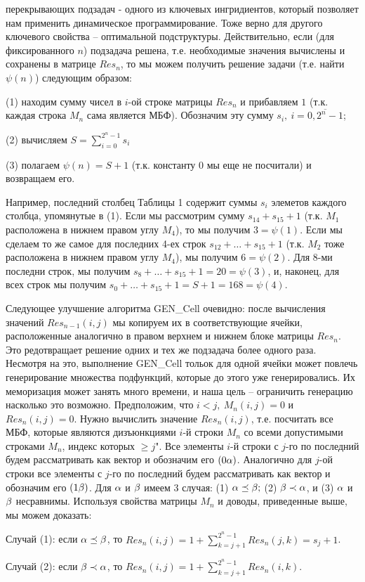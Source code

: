 перекрывающих подзадач - одного из ключевых ингридиентов, 
который позволяет нам применить динамическое программирование.
Тоже верно для другого ключевого свойства -- оптимальной подструктуры.
Действительно, если (для фиксированного $n$) подзадача решена, т.е. необходимые 
значения вычислены и сохранены в матрице $Res_n$, то мы можем получить решение
задачи (т.е. найти $\psi(n)$) следующим образом:\par
  (1) находим сумму чисел в $i$-ой строке матрицы $Res_n$ и прибавляем $1$ (т.к.
  каждая строка $M_n$ сама является МБФ). Обозначим эту сумму 
  $s_i,\ i=\overline{0, 2^n - 1}$;\par
  (2) вычисляем $S = \sum\limits_{i=0}^{2^n - 1} s_i$ \par
  (3) полагаем $\psi(n) = S + 1$ (т.к. константу $0$ мы еще не посчитали) и 
  возвращаем его.\par
Например, последний столбец Таблицы 1 содержит суммы $s_i$
элеметов каждого столбца, упомянутые в (1).
Если мы рассмотрим сумму $s_{14} + s_{15} + 1$ (т.к. $M_1$ расположена в нижнем правом
углу $M_4$), то мы получим $3 = \psi(1)$. Если мы сделаем то же самое для 
последних 4-ех строк $s_{12} + \dots + s_{15} + 1$ (т.к. $M_2$ тоже расположена
в нижнем правом углу $M_4$), мы получим $6 = \psi(2)$. 
Для 8-ми последни строк, мы получим $s_8 + \dots + s_{15} + 1 = 20 = \psi(3)$, 
и, наконец, для всех строк мы получим 
$s_0 + \dots + s_{15} + 1 = S + 1 = 168 = \psi(4)$. \par
Следующее улучшение алгоритма GEN\_Cell очевидно: 
после вычисления значений $Res_{n-1}(i, j)$ мы копируем их в соответствующие ячейки, расположенные
аналогично в правом верхнем и нижнем блоке матрицы $Res_n$. Это редотвращает решение одних и тех же 
подзадача более одного раза. Несмотря на это, выполнение GEN\_Cell тольок для одной ячейки может повлечь
генерирование множества подфункций, которые до этого уже генерировались. Их меморизация может занять много времени,
и наша цель -- ограничить генерацию насколько это возможно.
Предположим, что $i < j,\ M_n(i, j) = 0$ и $Res_n(i, j) = 0$. 
Нужно вычислить значение $Res_n(i,j)$, т.е. посчитать все МБФ, которые являются 
дизъюнкциями $i$-й строки $M_n$ со всеми
допустимыми строками $M_n$, индекс которых $\ge j$".
Все элементы $i$-й строки с $j$-го по последний будем рассматривать как вектор
и обозначим его $(0\alpha)$. Аналогично для $j$-ой строки все элементы с $j$-го по 
последний будем рассматривать как вектор
и обозначим его $(1\beta)$.
Для $\alpha$ и $\beta$ имеем 3 случая: (1) $\alpha \preceq \beta;$ (2) $\beta \prec \alpha$, 
и (3) $\alpha$ и $\beta$ несравнимы.
Используя свойства матрицы $M_n$ и доводы, приведенные выше, мы можем доказать:
\begin{Proposition}
 Случай (1): если $\alpha \preceq \beta$, то 
 $Res_n(i,j) = 1 + \sum\limits^{2^n-1}_{k=j+1} Res_n(j,k) = s_j + 1$. 
\end{Proposition}

\begin{Proposition}
 Случай (2): если $\beta \prec \alpha$, то 
 $Res_n(i,j) = 1 + \sum\limits^{2^n-1}_{k=j+1} Res_n(i,k)$. 
\end{Proposition}



